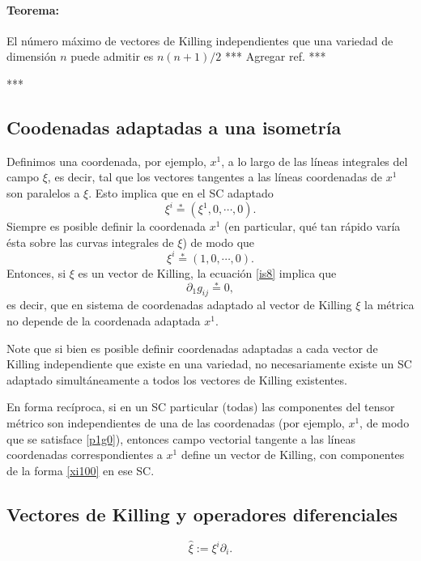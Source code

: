 \paragraph{Teorema:} El número máximo de vectores de Killing independientes que una variedad de dimensión $n$ puede admitir es $n(n+1)/2$ *** Agregar ref. ***

***
\subsection{Coodenadas adaptadas a una isometría}

Definimos una coordenada, por ejemplo, $x^1$, a lo largo de las líneas integrales del campo $\xi$, es decir, tal que los vectores tangentes a las líneas coordenadas de $x^1$ son paralelos a $\xi$. Esto implica que en el SC adaptado 
\begin{equation}
\xi^i\stackrel{*}{=}(\xi^1,0,\cdots,0).
\end{equation}
Siempre es posible definir la coordenada $x^1$ (en particular, qué tan rápido varía ésta sobre las curvas integrales de $\xi$) de modo que
\begin{equation}\label{xi100}
\xi^i\stackrel{*}{=}(1,0,\cdots,0).
\end{equation}
Entonces, si $\xi$ es un vector de Killing, la ecuación \eqref{is8} implica que
\begin{equation}\label{p1g0}
\partial_1g_{ij}\stackrel{*}{=}0,
\end{equation}
es decir, que en sistema de coordenadas adaptado al vector de Killing $\xi$ la métrica no depende de la coordenada adaptada $x^1$.

Note que si bien es posible definir coordenadas adaptadas a cada vector de Killing independiente que existe en una variedad, no necesariamente existe un SC adaptado simultáneamente a todos los vectores de Killing existentes.

En forma recíproca, si en un SC particular (todas) las componentes del tensor métrico son independientes de una de las coordenadas (por ejemplo, $x^1$, de modo que se satisface \eqref{p1g0}), entonces campo vectorial tangente a las líneas coordenadas correspondientes a $x^1$ define un vector de Killing, con componentes de la forma \eqref{xi100} en ese SC.

\subsection{Vectores de Killing y operadores diferenciales}
\begin{equation}
\hat{\xi}:=\xi^i\partial_i.
\end{equation}


